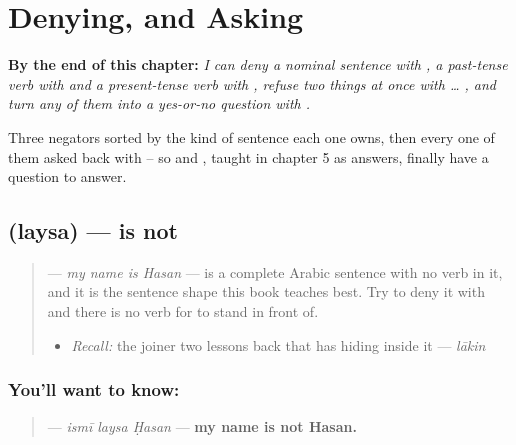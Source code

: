 
\chapter{Denying, and Asking}
\label{ch:ar-denying-and-asking}

\begin{chapteropening}
\textbf{By the end of this chapter:} \emph{I can deny a nominal sentence with , a past-tense verb with  and a present-tense verb with , refuse two things at once with  … , and turn any of them into a yes-or-no question with .}

Three negators sorted by the kind of sentence each one owns, then every one of them asked back with  -- so  and , taught in chapter 5 as answers, finally have a question to answer.
\end{chapteropening}

\section[\texorpdfstring{\ar{ليس} (laysa)}{ليس (laysa)}]{ (laysa) — is not}

\label{lesson:AR-C39-laysa}



\begin{quote}
\textbf{ } — \emph{my name is Hasan} — is a complete Arabic sentence with no verb in it, and it is the sentence shape this book teaches best. Try to deny it with \textbf{} and there is no verb for \textbf{} to stand in front of.

\begin{itemize}
\raggedright
  \item \emph{Recall:} the joiner two lessons back that has \textbf{} hiding inside it — \emph{lākin}
\end{itemize}
\end{quote}

\subsection*{You'll want to know: }
\begin{quote}
\textbf{  } — \emph{ismī laysa Ḥasan} — \textbf{my name is not Hasan.}
\end{quote}

